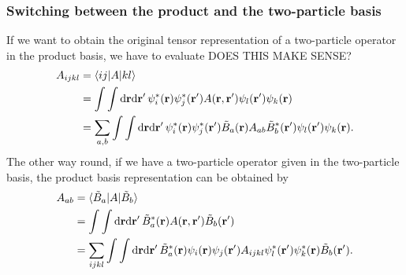 \documentclass[12pt,a4paper]{scrartcl}
\numberwithin{equation}{section}
\newcommand{\cng}[1]{{\color{red}#1}}
\renewcommand{\vec}{\mathbf}
\begin{document}
\subsubsection{Switching between the product and the two-particle basis}
If we want to obtain the original tensor representation of a two-particle operator in the 
product basis, we have to evaluate \cng{DOES THIS MAKE SENSE?}
\begin{align}
A_{ijkl} &= \braket{ij | A | kl }  \\
&= \int \int \mathrm{d}\vec{r}\mathrm{d}\vec{r}' \, \psi^*_i(\vec{r})\psi^*_j(\vec{r}') 
                                          A(\vec{r},\vec{r}') \psi_l(\vec{r}')\psi_k(\vec{r}) \\
&= \sum_{a,b}\int \int \mathrm{d}\vec{r}\mathrm{d}\vec{r}' \, \psi^*_i(\vec{r})\psi^*_j(\vec{r}') 
         \tilde{B}_a(\vec{r}) A_{ab}\tilde{B}^*_b(\vec{r}') \psi_l(\vec{r}')\psi_k(\vec{r}).
\end{align}
The other way round, if we have a two-particle operator given in the two-particle basis, the product basis
representation can be obtained by
\begin{align}
A_{ab}
&= \braket{ \tilde{B}_a | A | \tilde{B}_b } \\
&= \int \int \mathrm{d}\vec{r}\mathrm{d}\vec{r}' \,  \tilde{B}^*_a(\vec{r})  A(\vec{r},\vec{r}') \tilde{B}_b(\vec{r}') \\
&=\sum_{ijkl} \int \int \mathrm{d}\vec{r}\mathrm{d}\vec{r}' \,  \tilde{B}^*_a(\vec{r})  
    \psi_i(\vec{r})\psi_j(\vec{r}') A_{ijkl} \psi^*_l(\vec{r}')\psi^*_k(\vec{r}) \tilde{B}_b(\vec{r}') .
\end{align}

\clearpage

% 
% 
\end{document}
